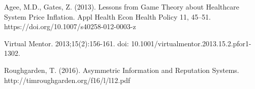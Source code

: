 \documentclass{article}
\begin{document}
\begin{thebibliography}{8}
Agee, M.D., Gates, Z. (2013). Lessons from Game Theory about Healthcare System Price Inflation. Appl Health Econ Health Policy 11, 45–51. https://doi.org/10.1007/s40258-012-0003-z

Virtual Mentor. 2013;15(2):156-161. doi: 10.1001/virtualmentor.2013.15.2.pfor1-1302.

Roughgarden, T. (2016). Asymmetric Information and Reputation Systems. http://timroughgarden.org/f16/l/l12.pdf

\end{thebibliography}

\end{document}
